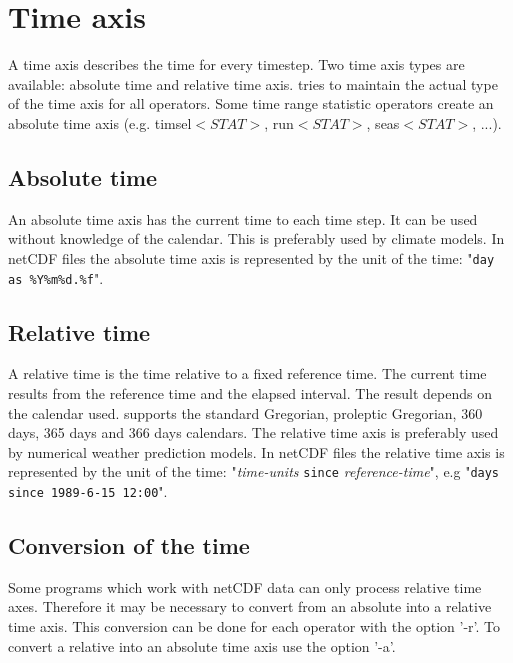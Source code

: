 \section{Time axis}

A time axis describes the time for every timestep.
Two time axis types are available: absolute time and relative time axis.
{\CDO} tries to maintain the actual type of the time axis for all operators.
Some time range statistic operators create an absolute time axis
(e.g. timsel$<\!STAT\!>$, run$<\!STAT\!>$, seas$<\!STAT\!>$, ...).

\subsection{Absolute time}

An absolute time axis has the current time to each time step.
It can be used without knowledge of the calendar.
This is preferably used by climate models.
In netCDF files the absolute time axis is represented by the 
unit of the time: {"{\tt day as \%Y\%m\%d.\%f}"}.

\subsection{Relative time}

A relative time is the time relative to a fixed reference time.
The current time results from the reference time and the elapsed interval.
The result depends on the calendar used.
{\CDO} supports the standard Gregorian, proleptic Gregorian, 360 days, 365 days and 366 days calendars.
The relative time axis is preferably used by numerical weather prediction models.
In netCDF files the relative time axis is represented by the 
unit of the time: {"{\it time-units} {\tt since} {\it reference-time}"},
e.g "{\tt days since 1989-6-15 12:00}".

\subsection{Conversion of the time}

Some programs which work with netCDF data can only process relative time axes.
Therefore it may be necessary to convert from an absolute into a relative time axis.
This conversion can be done for each operator with the {\CDO} option '-r'.
To convert a relative into an absolute time axis use the {\CDO} option '-a'.
